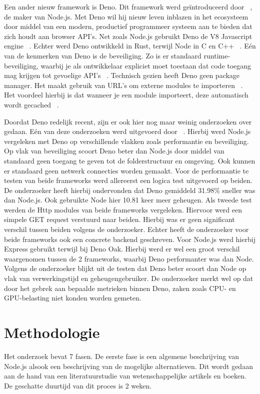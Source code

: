 Een ander nieuw framework is Deno. 
Dit framework werd geïntroduceerd door ~\textcite{Dahl2021}, de maker van Node.js.
Met Deno wil hij nieuw leven inblazen in het ecosysteem door middel van een modern, productief programmeer systeem aan te bieden dat zich houdt aan browser API's.
Net zoals Node.js gebruikt Deno de V8 Javascript engine ~\autocite{DenoLand2023}. Echter werd Deno ontwikkeld in Rust, terwijl Node in C en C++ ~\autocite{DenoLand2023}. 
Eén van de kenmerken van Deno is de beveiliging. Zo is er standaard runtime-beveiliging, 
waarbij je als ontwikkelaar expliciet moet toestaan dat code toegang mag krijgen tot gevoelige API's ~\autocite{DenoLand2023}.
Technisch gezien heeft Deno geen package manager. Het maakt gebruik van URL's om externe modules te importeren ~\autocite{DenoLand2023}.
Het voordeel hierbij is dat wanneer je een module importeert, deze automatisch wordt gecached ~\autocite{DenoLand2023}.

Doordat Deno redelijk recent, zijn er ook hier nog maar weinig onderzoeken over gedaan.
Eén van deze onderzoeken werd uitgevoerd door ~\textcite{VanKerkvoorde2021}. 
Hierbij werd Node.js vergeleken met Deno op verschillende vlakken zoals performantie en beveiliging.
Op vlak van beveiliging scoort Deno beter dan Node.js door middel van standaard geen toegang te geven tot de folderstructuur en omgeving. 
Ook kunnen er standaard geen netwerk connecties worden gemaakt. 
Voor de performantie te testen van beide frameworks werd allereerst een logica test uitgevoerd op beiden. 
De onderzoeker heeft hierbij ondervonden dat Deno gemiddeld 31.98\% sneller was dan Node.js. Ook gebruikte Node hier 10.81 keer meer geheugen.
Als tweede test werden de Http modules van beide frameworks vergeleken. Hiervoor werd een simpele GET request verstuurd naar beiden. 
Hierbij was er geen significant verschil tussen beiden volgens de onderzoeker.
Echter heeft de onderzoeker voor beide frameworks ook een concrete backend geschreven. Voor Node.js werd hierbij Express gebruikt terwijl bij Deno Oak.
Hierbij werd er wel een groot verschil waargenomen tussen de 2 frameworks, waarbij Deno performanter was dan Node.
Volgens de onderzoeker blijkt uit de testen dat Deno beter scoort dan Node op vlak van verwerkingstijd en geheugengebruiker.
De onderzoeker merkt wel op dat door het gebrek aan bepaalde metrieken binnen Deno, zaken zoals CPU- en GPU-belasting niet konden worden gemeten.
\section{Methodologie}%
\label{sec:methodologie}
Het onderzoek bevat 7 fasen.
De eerste fase is een algemene beschrijving van Node.js alsook een beschrijving van de mogelijke alternatieven. 
Dit wordt gedaan aan de hand van een literatuurstudie van wetenschappelijke artikels en boeken. 
De geschatte duurtijd van dit proces is 2 weken.

